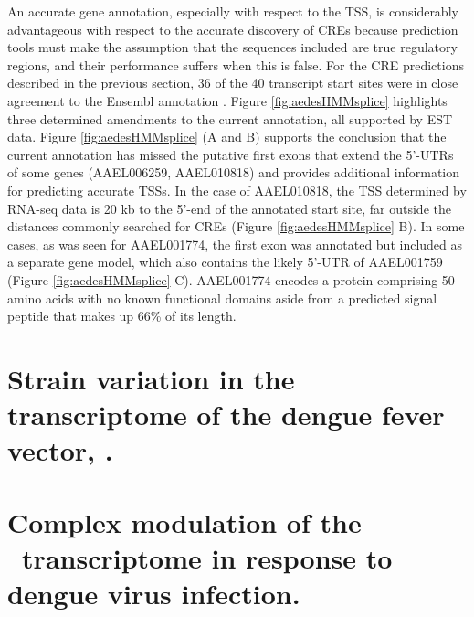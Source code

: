 An accurate gene annotation, especially with respect to the \gls{TSS}, is considerably advantageous with respect to the accurate discovery of \glspl{CRE} because prediction tools must make the assumption that the sequences included are true regulatory regions, and their performance suffers when this is false. For the \gls{CRE} predictions described in the previous section, 36 of the 40 transcript start sites were in close agreement to the Ensembl annotation \cite{Hubbard2002}. Figure \ref{fig:aedesHMMsplice} highlights three determined amendments to the current annotation, all supported by EST data. Figure \ref{fig:aedesHMMsplice} (A and B) supports the conclusion that the current annotation has missed the putative first exons that extend the 5'-UTRs of some genes (AAEL006259, AAEL010818) and provides additional information for predicting accurate \glspl{TSS}. In the case of AAEL010818, the \gls{TSS} determined by RNA-seq data is 20 kb to the 5'-end of the annotated start site, far outside the distances commonly searched for \glspl{CRE} (Figure \ref{fig:aedesHMMsplice} B). In some cases, as was seen for AAEL001774, the first exon was annotated but included as a separate gene model, which also contains the likely 5'-UTR of AAEL001759 (Figure \ref{fig:aedesHMMsplice} C). AAEL001774 encodes a protein comprising 50 amino acids with no known functional domains aside from a predicted signal peptide that makes up 66\% of its length.






\pagebreak
\section{Strain variation in the transcriptome of the dengue fever vector, \Aea. \cite{bonizzoni2012strain}}










\pagebreak
\section{Complex modulation of the \Aea\ transcriptome in response to dengue virus infection. \cite{bonizzoni2012complex}}



